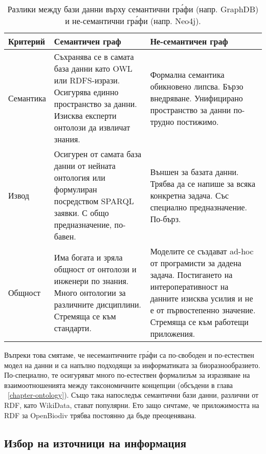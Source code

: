 \begin{table}
\caption{Разлики между бази данни върху семантични гр\'{а}фи (напр. GraphDB) и не-семантични гр\'{а}фи (напр. Neo4j).}
\begin{tabular}{>{\centering\arraybackslash}m{2.5cm}|>{\centering\arraybackslash}m{4.2cm}|>{\centering\arraybackslash}m{4.2cm}}
Критерий   & Семантичен граф & Не-семантичен граф\\
\hline
Семантика & Съхранява се в самата база данни като OWL или RDFS-изрази. Осигурява единно пространство за данни. Изисква експерти онтолози да извличат знания. & Формална семантика обикновено липсва. Бързо внедряване. Унифицирано пространство за данни по-трудно постижимо. \\
\hline
Извод & Осигурен от самата база данни от нейната онтология или формулиран посредством SPARQL заявки. С общо предназначение, по-бавен. & Външен за базата данни. Трябва да се напише за всяка конкретна задача. Със специално предназначение. По-бърз. \\
\hline
Общност & Има богата и зряла общност от онтолози и инженери по знания. Много онтологии за различните дисциплини. Стремяща се към стандарти. & Моделите се създават ad-hoc от програмисти за дадена задача. Постигането на интероперативност на данните изисква усилия и не е от първостепенно значение. Стремяща се към работещи приложения. \\
\hline
\end{tabular}
\label{graphdb-vs-neo4k}
\end{table}

Въпреки това смятаме, че несемантичните гр\'{а}фи са по-свободен и по-естествен модел на данни и са напълно подходящи за информатиката за биоразнообразието. По-специално, те осигуряват много по-естествен формализъм за изразяване на взаимоотношенията между таксономичните концепции (обсъдени в глава ~\ref{chapter-ontology}). Също така напоследък семантични бази данни, различни от RDF, като \mbox {WikiData}, стават популярни. Ето защо сичтаме, че приложимостта на RDF за OpenBiodiv трябва постоянно да бъде преоценявана.

\subsection*{Избор на източници на информация}

